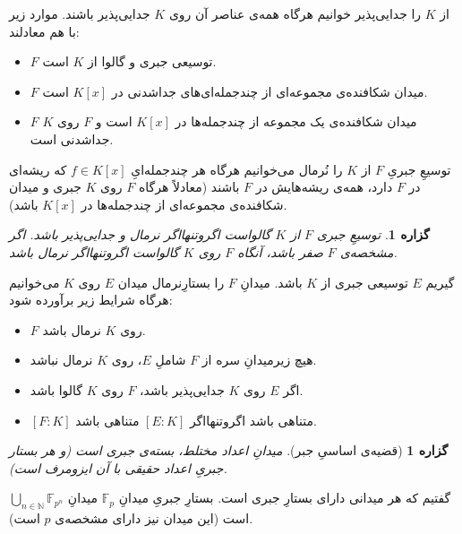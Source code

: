 \documentclass[12pt,a4paper]{article}
\theoremstyle{colorhead}
\newtheorem{prop}[thm]{گزاره}
\begin{document}
از
$K$
را جدایی‌پذیر خوانیم هرگاه همه‌ی عناصر آن روی
$K$
جدایی‌پذیر باشند. موارد زیر با هم معادلند:
\begin{itemize}
\item 
$F$
توسیعی جبری و گالوا از
$K$
است.
\item 
$F$
میدان شکافنده‌ی مجموعه‌ای از چندجمله‌ای‌های جداشدنی در
$K[x]$
است.
\item 
$F$
میدان شکافنده‌ی یک مجموعه از چندجمله‌ها در
$K[x]$
است و 
$F$
روی
$K$
جداشدنی است.
\end{itemize}
توسیعِ جبریِ
$F$
از
$K$
را نُرمال می‌خوانیم هرگاه هر چندجمله‌ایِ
$f\in K[x]$
که ریشه‌ای در
$F$
دارد، همه‌ی ریشه‌هایش در
$F$
باشند (معادلاً هرگاه
$F$
روی
$K$
جبری و میدان شکافنده‌ی مجموعه‌ای از چندجمله‌ها در
$K[x]$
باشد).
\begin{prop}
توسیعِ جبری
$F$
از
$K$
گالواست اگروتنهااگر
نرمال  و جدایی‌پذیر باشد. اگر مشخصه‌ی
$F$
صفر باشد، آنگاه
$F$
روی
$K$
گالواست اگروتنهااگر نرمال باشد.
\end{prop}
گیریم
$E$
توسیعی جبری از
$K$
باشد. میدانِ
$F$
را بستارِنرمال
میدان
$E$
روی
$K$
می‌خوانیم هرگاه شرایط زیر برآورده شود:
\begin{itemize}
\item 
$F$
روی
$K$
نرمال باشد.
\item
هیچ زیرمیدانِ سره از
$F$
شاملِ
$E$، 
روی
$K$
نرمال نباشد.
\item
اگر
$E$
روی
$K$
جدایی‌پذیر باشد،
$F$
روی
$K$
گالوا باشد.
\item
$[F:K]$
متناهی باشد اگروتنهااگر
$[E:K]$
متناهی باشد.
\end{itemize}
\begin{prop}[قضیه‌ی اساسیِ  جبر]
\label{asasijabr}
میدانِ اعداد مختلط، بسته‌ی جبری است (و هر بستار جبریِ اعداد حقیقی با آن ایزومرف است).
\end{prop}
گفتیم که هر میدانی دارای بستارِ جبری است. بستارِ جبریِ‌
میدانِ
$\mathbb{F}_p$
میدانِ
$\bigcup_{n\in\mathbb{N}} \mathbb{F}_{p^n}$
است (این میدان نیز دارای مشخصه‌ی
$p$
است).
\end{document}
